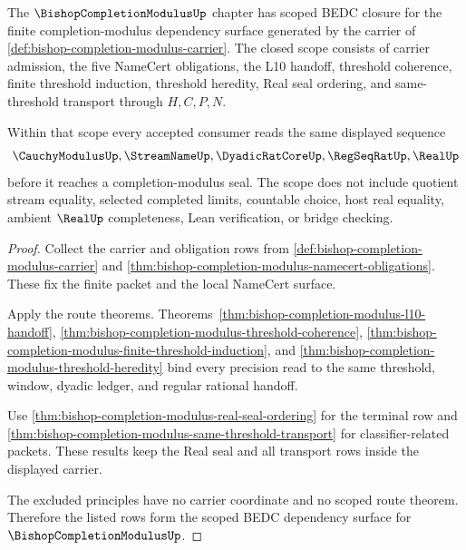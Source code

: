 \begin{theorem}
\label{thm:bishop-completion-modulus-scope-closure}
The $\BishopCompletionModulusUp$ chapter has scoped BEDC closure for the finite completion-modulus dependency surface generated by the carrier of \autoref{def:bishop-completion-modulus-carrier}. The closed scope consists of carrier admission, the five NameCert obligations, the L10 handoff, threshold coherence, finite threshold induction, threshold heredity, Real seal ordering, and same-threshold transport through $H,C,P,N$.

Within that scope every accepted consumer reads the same displayed sequence
$$
\CauchyModulusUp,\StreamNameUp,\DyadicRatCoreUp,\RegSeqRatUp,\RealUp
$$
before it reaches a completion-modulus seal. The scope does not include quotient stream equality, selected completed limits, countable choice, host real equality, ambient $\RealUp$ completeness, Lean verification, or bridge checking.
\end{theorem}
\begin{proof}
Collect the carrier and obligation rows from \autoref{def:bishop-completion-modulus-carrier} and \autoref{thm:bishop-completion-modulus-namecert-obligations}. These fix the finite packet and the local NameCert surface.

Apply the route theorems. Theorems~\ref{thm:bishop-completion-modulus-l10-handoff}, \ref{thm:bishop-completion-modulus-threshold-coherence}, \ref{thm:bishop-completion-modulus-finite-threshold-induction}, and \ref{thm:bishop-completion-modulus-threshold-heredity} bind every precision read to the same threshold, window, dyadic ledger, and regular rational handoff.

Use \autoref{thm:bishop-completion-modulus-real-seal-ordering} for the terminal row and \autoref{thm:bishop-completion-modulus-same-threshold-transport} for classifier-related packets. These results keep the Real seal and all transport rows inside the displayed carrier.

The excluded principles have no carrier coordinate and no scoped route theorem. Therefore the listed rows form the scoped BEDC dependency surface for $\BishopCompletionModulusUp$.
\end{proof}

